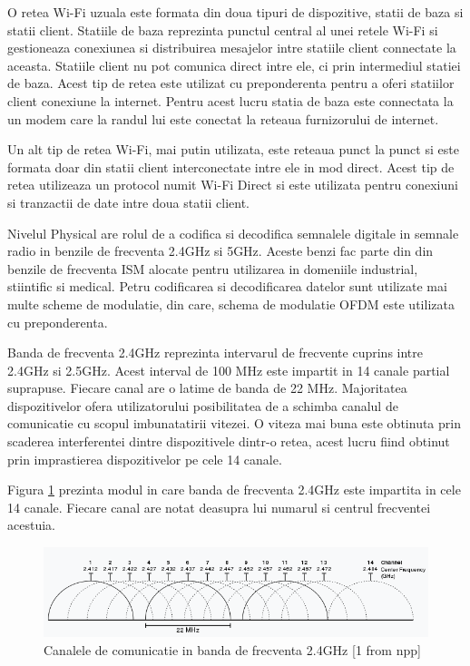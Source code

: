 O retea Wi-Fi uzuala este formata din doua tipuri de dispozitive, statii de baza si statii client. Statiile de baza reprezinta punctul central al unei retele Wi-Fi 
si gestioneaza conexiunea si distribuirea mesajelor intre statiile client connectate la aceasta. Statiile client nu pot comunica direct intre ele, ci prin 
intermediul statiei de baza. Acest tip de retea este utilizat cu preponderenta pentru a oferi statiilor client conexiune la internet. Pentru acest lucru 
statia de baza este connectata la un modem care la randul lui este conectat la reteaua furnizorului de internet.

Un alt tip de retea Wi-Fi, mai putin utilizata, este reteaua punct la punct si este formata doar din statii client interconectate intre ele in mod direct. 
Acest tip de retea utilizeaza un protocol numit Wi-Fi Direct si este utilizata pentru conexiuni si tranzactii de date intre doua statii client.

Nivelul Physical are rolul de a codifica si decodifica semnalele digitale in semnale radio in benzile de frecventa 2.4GHz si 5GHz. Aceste benzi fac parte din 
din benzile de frecventa ISM alocate pentru utilizarea in domeniile industrial, stiintific si medical. Petru codificarea si decodificarea datelor 
sunt utilizate mai multe scheme de modulatie, din care, schema de modulatie OFDM este utilizata cu preponderenta. 

Banda de frecventa 2.4GHz reprezinta intervarul de frecvente cuprins intre 2.4GHz si 2.5GHz. Acest interval de 100 MHz este impartit in 14 canale partial 
suprapuse. Fiecare canal are o latime de banda de 22 MHz. Majoritatea dispozitivelor ofera utilizatorului posibilitatea de a schimba canalul de comunicatie 
cu scopul imbunatatirii vitezei. O viteza mai buna este obtinuta prin scaderea interferentei dintre dispozitivele dintr-o retea, acest lucru fiind obtinut 
prin imprastierea dispozitivelor pe cele 14 canale. 

Figura \ref{fig:2400MHz_channels} prezinta modul in care banda de frecventa 2.4GHz este impartita in cele 14 canale. Fiecare canal are notat deasupra lui 
numarul si centrul frecventei acestuia.
\begin{figure}[H]
    \centering
    \includegraphics[scale=0.8]{figs/2400MHz_channels.png}
    \caption{Canalele de comunicatie in banda de frecventa 2.4GHz [1 from npp]}
    \label{fig:2400MHz_channels}
\end{figure}

